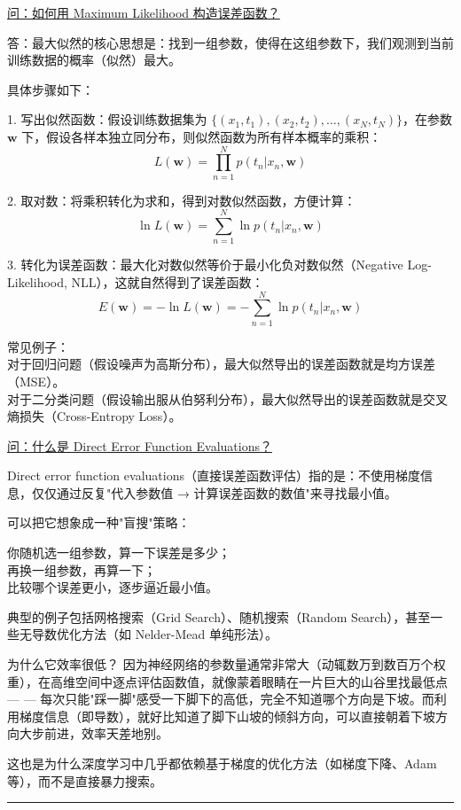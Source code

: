 \documentclass{article}
\begin{document}
{\color{blue}
\underline{问：如何用 Maximum Likelihood 构造误差函数？}

答：最大似然的核心思想是：找到一组参数，使得在这组参数下，我们观测到当前训练数据的概率（似然）最大。

具体步骤如下：

1. 写出似然函数：假设训练数据集为 $\{(x_1, t_1), (x_2, t_2), \dots, (x_N, t_N)\}$，在参数 $\mathbf{w}$ 下，假设各样本独立同分布，则似然函数为所有样本概率的乘积：
$$L(\mathbf{w}) = \prod_{n=1}^{N} p(t_n | x_n, \mathbf{w})$$

2. 取对数：将乘积转化为求和，得到对数似然函数，方便计算：
$$\ln L(\mathbf{w}) = \sum_{n=1}^{N} \ln p(t_n | x_n, \mathbf{w})$$

3. 转化为误差函数：最大化对数似然等价于最小化负对数似然（Negative Log-Likelihood, NLL），这就自然得到了误差函数：
$$E(\mathbf{w}) = -\ln L(\mathbf{w}) = -\sum_{n=1}^{N} \ln p(t_n | x_n, \mathbf{w})$$

常见例子：\\
对于回归问题（假设噪声为高斯分布），最大似然导出的误差函数就是均方误差（MSE）。\\
对于二分类问题（假设输出服从伯努利分布），最大似然导出的误差函数就是交叉熵损失（Cross-Entropy Loss）。


\underline{问：什么是 Direct Error Function Evaluations？}

Direct error function evaluations（直接误差函数评估）指的是：不使用梯度信息，仅仅通过反复"代入参数值 → 计算误差函数的数值"来寻找最小值。

可以把它想象成一种"盲搜"策略：

你随机选一组参数，算一下误差是多少；\\
再换一组参数，再算一下；\\
比较哪个误差更小，逐步逼近最小值。

典型的例子包括网格搜索（Grid Search）、随机搜索（Random Search），甚至一些无导数优化方法（如 Nelder-Mead 单纯形法）。

为什么它效率很低？ 因为神经网络的参数量通常非常大（动辄数万到数百万个权重），在高维空间中逐点评估函数值，就像蒙着眼睛在一片巨大的山谷里找最低点 — — 每次只能"踩一脚"感受一下脚下的高低，完全不知道哪个方向是下坡。而利用梯度信息（即导数），就好比知道了脚下山坡的倾斜方向，可以直接朝着下坡方向大步前进，效率天差地别。

这也是为什么深度学习中几乎都依赖基于梯度的优化方法（如梯度下降、Adam 等），而不是直接暴力搜索。
}

\noindent\rule{\linewidth}{0.4pt}
\end{document}
